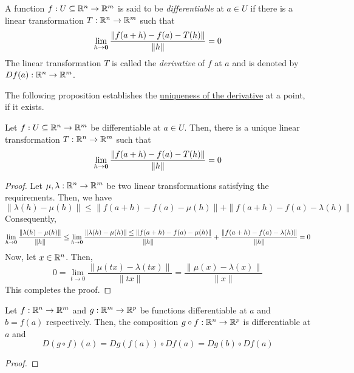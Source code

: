 \begin{definition}
    A function $f: U\subseteq\mathbb{R}^n\to\mathbb{R}^m$ is said to be \emph{differentiable} at $a\in U$ if there is a linear transformation $T:\mathbb{R}^n\to\mathbb{R}^m$ such that 
    \begin{equation*}
        \lim_{h\to\mathbf{0}}\frac{\|f(a + h) - f(a) - T(h)\|}{\|h\|} = 0
    \end{equation*}
    The linear transformation $T$ is called the \emph{derivative} of $f$ at $a$ and is denoted by $Df(a):\mathbb{R}^n\to\mathbb{R}^m$.
\end{definition}

The following proposition establishes the \underline{uniqueness of the derivative} at a point, if it exists.

\begin{proposition}
    Let $f:U\subseteq\mathbb{R}^n\to\mathbb{R}^m$ be differentiable at $a\in U$. Then, there is a unique linear transformation $T:\mathbb{R}^n\to\mathbb{R}^m$ such that 
    \begin{equation*}
        \lim_{h\to\mathbf{0}}\frac{\|f(a + h) - f(a) - T(h)\|}{\|h\|} = 0
    \end{equation*}
\end{proposition}
\begin{proof}
    Let $\mu,\lambda: \mathbb{R}^n\to\mathbb{R}^m$ be two linear transformations satisfying the requirements. Then, we have 
    \begin{equation*}
        \|\lambda(h) - \mu(h)\|\le\|f(a + h) - f(a) - \mu(h)\| + \|f(a + h) - f(a) - \lambda(h)\|
    \end{equation*}
    Consequently, 
    \begin{equation*}
        \lim_{h\to\mathbf{0}}\frac{\|\lambda(h) - \mu(h)\|}{\|h\|}\le\lim_{h\to\mathbf{0}}\frac{\|\lambda(h) - \mu(h)\|\le\|f(a + h) - f(a) - \mu(h)\|}{\|h\|} + \frac{\|f(a + h) - f(a) - \lambda(h)\|}{\|h\|} = 0
    \end{equation*}
    Now, let $x\in\mathbb{R}^n$. Then, 
    \begin{equation*}
        0 = \lim_{t\to 0}\frac{\|\mu(tx) - \lambda(tx)\|}{\|tx\|} = \frac{\|\mu(x) - \lambda(x)\|}{\|x\|}
    \end{equation*}
    This completes the proof.
\end{proof}

\begin{theorem}
    Let $f:\mathbb{R}^n\to\mathbb{R}^m$ and $g:\mathbb{R}^m\to\mathbb{R}^p$ be functions differentiable at $a$ and $b = f(a)$ respectively. Then, the composition $g\circ f:\mathbb{R}^n\to\mathbb{R}^p$ is differentiable at $a$ and 
    \begin{equation*}
        D(g\circ f)(a) = Dg(f(a))\circ Df(a) = Dg(b)\circ Df(a)
    \end{equation*}
\end{theorem}
\begin{proof}
\end{proof}

